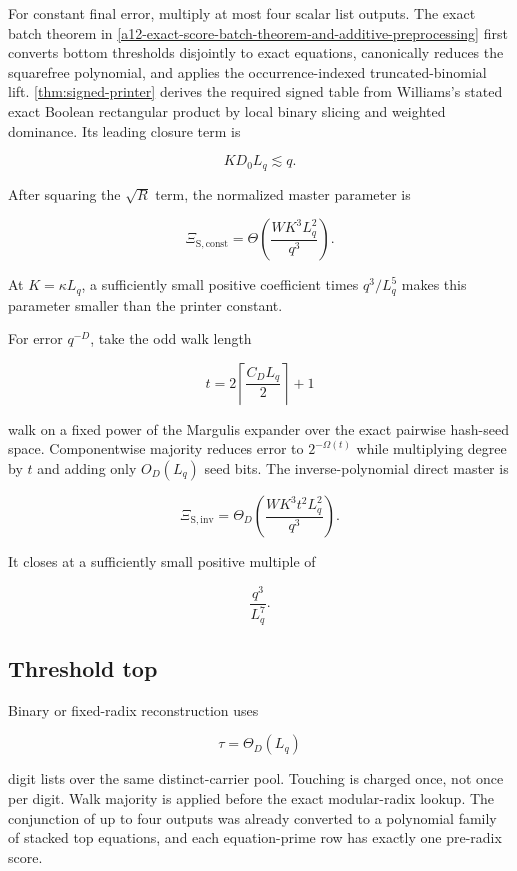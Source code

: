 \documentclass[11pt,letterpaper]{article}
\newcommand{\cref}[1]{\ref{#1}}
\theoremstyle{definition}
\theoremstyle{remark}
\begin{document}
For constant final error, multiply at most four scalar list outputs. The
exact batch theorem in \cref{a12-exact-score-batch-theorem-and-additive-preprocessing} first converts bottom thresholds
disjointly to exact equations, canonically reduces the squarefree
polynomial, and applies the occurrence-indexed truncated-binomial lift.
\cref{thm:signed-printer} derives the required signed table from
Williams's stated exact Boolean rectangular product by
local binary slicing and weighted dominance. Its leading closure term is

\[
K D_0 L_q\lesssim q.
\]

After squaring the \(\sqrt R\) term, the normalized master parameter is

\[
\Xi_{\mathrm S,\mathrm{const}}
{}={}
\Theta\left(
\frac{W K^3L_q^2}{q^3}
\right).
\]

At \(K=\kappa L_q\), a sufficiently small positive coefficient times
\(q^3/L_q^5\) makes this parameter smaller than the printer constant.

For error \(q^{-D}\), take the odd walk length

\[
t=2\left\lceil\frac{C_D L_q}{2}\right\rceil+1
\]

walk on a fixed power of the Margulis expander over the exact pairwise
hash-seed space. Componentwise majority reduces error to
\(2^{-\Omega(t)}\) while multiplying degree by \(t\) and adding only
\(O_D(L_q)\) seed bits. The inverse-polynomial direct master is

\[
\Xi_{\mathrm S,\mathrm{inv}}
{}={}
\Theta_D\left(
\frac{W K^3t^2L_q^2}{q^3}
\right).
\]

It closes at a sufficiently small positive multiple of

\[
\frac{q^3}{L_q^7}.
\]

\subsection{Threshold top}\label{42-threshold-top}

Binary or fixed-radix reconstruction uses

\[
\tau=\Theta_D(L_q)
\]

digit lists over the same distinct-carrier pool. Touching is charged
once, not once per digit. Walk majority is applied before the exact
modular-radix lookup. The conjunction of up to four outputs was already
converted to a polynomial family of stacked top equations, and each
equation-prime row has exactly one pre-radix score.
\end{document}
